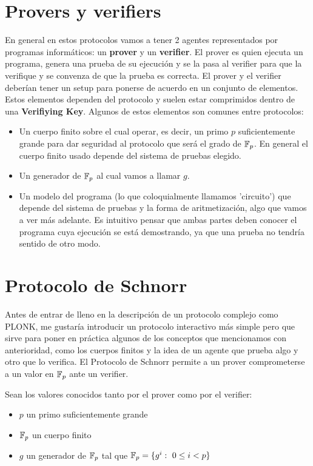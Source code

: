 \section{Provers y verifiers}
En general en estos protocolos vamos a tener 2 agentes representados por programas informáticos: un \textbf{prover} y un \textbf{verifier}. El prover es quien ejecuta un programa, genera una prueba de su ejecución y se la pasa al verifier para que la verifique y se convenza de que la prueba es correcta. El prover y el verifier deberían tener un setup para ponerse de acuerdo en un conjunto de elementos. Estos elementos dependen del protocolo y suelen estar comprimidos dentro de una \textbf{Verifiying Key}. Algunos de estos elementos son comunes entre protocolos:
\begin{itemize}
    \item Un cuerpo finito sobre el cual operar, es decir, un primo $p$ suficientemente grande para dar seguridad al protocolo que será el grado de $\mathbb{F}_p$. En general el cuerpo finito usado depende del sistema de pruebas elegido.
    \item Un generador de $\mathbb{F}_p$ al cual vamos a llamar $g$.
    \item Un modelo del programa (lo que coloquialmente llamamos 'circuito') que depende del sistema de pruebas y la forma de aritmetización, algo que vamos a ver más adelante. Es intuitivo pensar que ambas partes deben conocer el programa cuya ejecución se está demostrando, ya que una prueba no tendría sentido de otro modo.
\end{itemize}

\section{Protocolo de Schnorr} \label{sec:schnorr}
Antes de entrar de lleno en la descripción de un protocolo complejo como PLONK, me gustaría introducir un protocolo interactivo más simple pero que sirve para poner en práctica algunos de los conceptos que mencionamos con anterioridad, como los cuerpos finitos y la idea de un agente que prueba algo y otro que lo verifica. El Protocolo de Schnorr permite a un prover comprometerse a un valor en $\mathbb{F}_p$ ante un verifier. 

Sean los valores conocidos tanto por el prover como por el verifier: 
\begin{itemize}
    \item $p$ un primo suficientemente grande
    \item $\mathbb{F}_p$ un cuerpo finito
    \item $g$ un generador de $\mathbb{F}_p$ tal que $\mathbb{F}_p = \{g^i:~0\leq i < p\}$
\end{itemize} 

